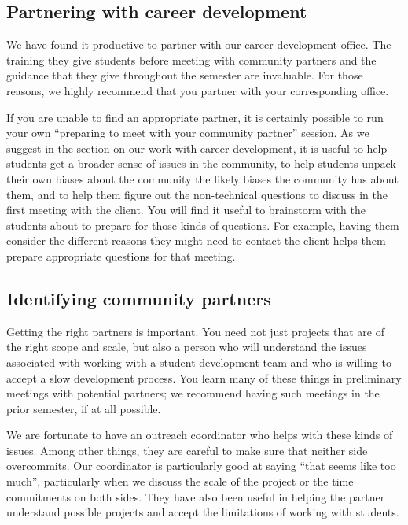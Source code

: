 \subsection{Partnering with career development}

We have found it productive to partner with our career development
office.  The training they give students before meeting with community
partners and the guidance that they give throughout the semester
are invaluable.  For those reasons, we highly recommend that you
partner with your corresponding office.

If you are unable to find an appropriate partner, it is certainly
possible to run your own ``preparing to meet with your community
partner'' session.  As we suggest in the section on our work with
career development, it is useful to help students get a broader
sense of issues in the community, to help students
unpack their own biases about the community the
likely biases the community has about them, and to
help them figure out the non-technical questions to discuss in the
first meeting with the client.  You will find it useful to brainstorm
with the students about to prepare for those kinds of questions.
For example, having them consider the different reasons they might
need to contact the client helps them prepare appropriate questions
for that meeting.

\subsection{Identifying community partners}

Getting the right partners is important.  You need not just projects that
are of the right scope and scale, but also a person who will understand
the issues associated with working with a student development team and
who is willing to accept a slow development process.  You learn many of
these things in preliminary meetings with potential partners; we recommend
having such meetings in the prior semester, if at all possible.

We are fortunate to have an outreach coordinator who helps with these kinds
of issues.  Among other things, they are careful to make sure that neither
side overcommits.  Our coordinator is particularly good at saying ``that
seems like too much'', particularly when we discuss the scale of the project
or the time commitments on both sides.  They have also been useful in
helping the partner understand possible projects and accept the limitations
of working with students.

